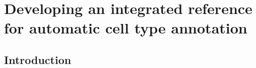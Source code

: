 \chapter{Developing an integrated reference for automatic cell type annotation} \label{chap:CT_method}

\ifpdf
    \graphicspath{{Chapter3/Figs/Raster/}{Chapter3/Figs/PDF/}{Chapter3/Figs/}}
\else
    \graphicspath{{Chapter3/Figs/Vector/}{Chapter3/Figs/}}
\fi

\section{Introduction}
